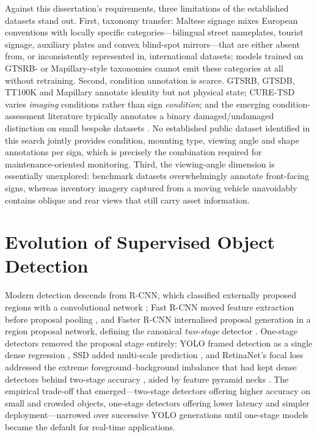 Against this dissertation's requirements, three limitations of the established datasets stand out. First, taxonomy transfer: Maltese signage mixes European conventions with locally specific categories---bilingual street nameplates, tourist signage, auxiliary plates and convex blind-spot mirrors---that are either absent from, or inconsistently represented in, international datasets; models trained on GTSRB- or Mapillary-style taxonomies cannot emit these categories at all without retraining. Second, condition annotation is scarce. GTSRB, GTSDB, TT100K and Mapillary annotate identity but not physical state; CURE-TSD varies \emph{imaging} conditions rather than sign \emph{condition}; and the emerging condition-assessment literature typically annotates a binary damaged/undamaged distinction on small bespoke datasets \citep{merolla2025improving}. No established public dataset identified in this search jointly provides condition, mounting type, viewing angle and shape annotations per sign, which is precisely the combination required for maintenance-oriented monitoring. Third, the viewing-angle dimension is essentially unexplored: benchmark datasets overwhelmingly annotate front-facing signs, whereas inventory imagery captured from a moving vehicle unavoidably contains oblique and rear views that still carry asset information.

\section{Evolution of Supervised Object Detection}
\label{sec:lr-detection}

Modern detection descends from R-CNN, which classified externally proposed regions with a convolutional network \citep{girshick2014rich}; Fast R-CNN moved feature extraction before proposal pooling \citep{girshick2015fast}, and Faster R-CNN internalised proposal generation in a region proposal network, defining the canonical \emph{two-stage} detector \citep{ren2015faster}. One-stage detectors removed the proposal stage entirely: YOLO framed detection as a single dense regression \citep{redmon2016you}, SSD added multi-scale prediction \citep{liu2016ssd}, and RetinaNet's focal loss addressed the extreme foreground--background imbalance that had kept dense detectors behind two-stage accuracy \citep{lin2017focal}, aided by feature pyramid necks \citep{lin2017feature}. The empirical trade-off that emerged---two-stage detectors offering higher accuracy on small and crowded objects, one-stage detectors offering lower latency and simpler deployment---narrowed over successive YOLO generations \citep{redmon2018yolov3,bochkovskiy2020yolov4,wang2023yolov7} until one-stage models became the default for real-time applications.

